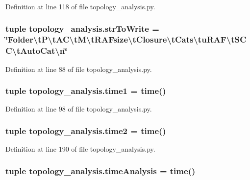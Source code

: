 Definition at line 118 of file topology\+\_\+analysis.\+py.

\hypertarget{a00159_acecbaeef1428691283d6df79d6b1e689}{
\subsubsection[{str\+To\+Write}]{\setlength{\rightskip}{0pt plus 5cm}tuple topology\+\_\+analysis.\+str\+To\+Write = \char`\"{}Folder\textbackslash{}t\+P\textbackslash{}t\+A\+C\textbackslash{}t\+M\textbackslash{}t\+R\+A\+Fsize\textbackslash{}t\+Closure\textbackslash{}t\+Cats\textbackslash{}tu\+R\+A\+F\textbackslash{}t\+S\+C\+C\textbackslash{}t\+Auto\+Cat\textbackslash{}n\char`\"{}}}\label{a00159_acecbaeef1428691283d6df79d6b1e689}


Definition at line 88 of file topology\+\_\+analysis.\+py.

\hypertarget{a00159_ac7160059dec8067db4645fa39feec359}{
\subsubsection[{time1}]{\setlength{\rightskip}{0pt plus 5cm}tuple topology\+\_\+analysis.\+time1 = time()}}\label{a00159_ac7160059dec8067db4645fa39feec359}


Definition at line 98 of file topology\+\_\+analysis.\+py.

\hypertarget{a00159_a44666efa43bfc08ab8305c8d325f7456}{
\subsubsection[{time2}]{\setlength{\rightskip}{0pt plus 5cm}tuple topology\+\_\+analysis.\+time2 = time()}}\label{a00159_a44666efa43bfc08ab8305c8d325f7456}


Definition at line 190 of file topology\+\_\+analysis.\+py.

\hypertarget{a00159_ace5bda70ff24e6a220afb4438240003a}{
\subsubsection[{time\+Analysis}]{\setlength{\rightskip}{0pt plus 5cm}tuple topology\+\_\+analysis.\+time\+Analysis = time()}}\label{a00159_ace5bda70ff24e6a220afb4438240003a}


